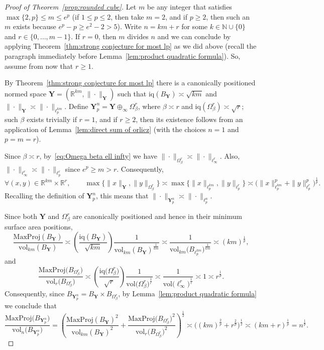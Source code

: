 \documentclass[11pt,reqno]{amsart}
\renewcommand{\le}{\leqslant}
\renewcommand{\ge}{\geqslant}
\newcommand{\Y}{\mathbf Y}
\newcommand{\R}{\mathbb R}
\theoremstyle{remark}
\newcommand{\iq}{\mathrm{iq}}
\newcommand{\N}{\mathbb N}
\newcommand{\vol}{\mathrm{vol}}
\renewcommand{\1}{\mathbf 1}
\begin{document}
\begin{proof}[Proof of Theorem~\ref{prop:rounded cube}] Let $m$ be any integer that satisfies $\max\{2,p\}\le m\le e^p$ (if $1\le p\le 2$, then take $m=2$, and if $p\ge 2$, then such an $m$ exists because $e^p-p\ge e^2-2>5$). Write $n=km+r$ for some $k\in \N\cup \{0\}$ and $r\in \{0,\ldots,m-1\}$. If $r=0$, then $m$ divides $n$  and we can conclude by applying Theorem~\ref{thm:strong conjecture for most lp}  as we did above (recall the paragraph immediately before Lemma~\ref{lem:product quadratic formula}). So, assume from now that $r\ge 1$.

By Theorem~\ref{thm:strong conjecture for most lp} there is a canonically positioned normed space $\Y=(\R^{km},\|\cdot\|_\Y)$ such that $\iq(B_\Y)\asymp \sqrt{km}$ and  $\|\cdot\|_\Y\asymp \|\cdot\|_{\ell_p^{km}}$. Define $\Y_p^n=\Y\oplus_\infty \Omega_{\beta}^r$, where $\beta\asymp r$ and $\iq(\Omega_\beta^r)\asymp \sqrt{r}$; such $\beta$ exists trivially if $r=1$, and if $r\ge 2$, then its existence follows from an application of Lemma~\ref{lem:direct sum of orlicz} (with the choices $n=1$ and $p=m=r$).

Since $\beta\asymp r$, by~\eqref{eq:Omega beta ell infty} we have $\|\cdot\|_{\Omega_\beta^r} \asymp \|\cdot\|_{\ell_\infty^r}$. Also, $\|\cdot\|_{\ell_\infty^r}\asymp \|\cdot\|_{\ell_p^r}$ since $e^p\ge m>r$. Consequently,
$$
\forall (x,y)\in \R^{km}\times \R^r,\qquad \max\big\{\|x\|_{\Y},\|y\|_{\Omega_\beta^r}\big\}\asymp \max\big\{\|x\|_{\ell_p^{km}},\|y\|_{\ell_p^r}\big\}\asymp \Big(\|x\|_{\ell_p^{km}}^p+\|y\|_{\ell_p^r}^p\Big)^{\frac{1}{p}}.
$$
Recalling the definition of $\Y_p^n$, this means that $\|\cdot\|_{\Y_p^n}\asymp \|\cdot\|_{\ell_p^n}$.


Since both $\Y$ and $\Omega_\beta^r$ are canonically positioned and hence in their minimum surface area positions,
$$
\frac{\mathrm{MaxProj}(B_\Y)}{\vol_{km}(B_\Y)}\asymp \left(\frac{\iq(B_\Y)}{\sqrt{km}}\right)\frac{1}{\vol_{km}(B_\Y)^{\frac{1}{km}}}\asymp \frac{1}{\vol_{km}\big(B_{\ell_p^{km}}\big)^{\frac{1}{km}}}\asymp (km)^{\frac{1}{p}},
$$
and
$$
\frac{\mathrm{MaxProj}\big(B_{\Omega_\beta^r}\big)}{\vol_{r}\big(B_{\Omega_\beta^r}\big)}\asymp \left(\frac{\iq\big(\Omega_\beta^r\big)}{\sqrt{r}}\right)\frac{1}{\vol\big(\Omega_\beta^r\big)^{\frac{1}{r}}}\asymp \frac{1}{\vol\big(\ell_\infty^r\big)^{\frac{1}{r}}}\asymp 1\asymp r^{\frac{1}{p}}.
$$
Consequently, since $B_{\Y_p^n}=B_\Y\times B_{\Omega_\beta^r}$, by Lemma~\ref{lem:product quadratic formula} we conclude that
\begin{equation*}
\frac{\mathrm{MaxProj}\big(B_{\Y_p^n}\big)}{\vol_{n}\big(B_{\Y_p^n}\big)}=\left(\frac{\mathrm{MaxProj}(B_\Y)^2}{\vol_{km}(B_\Y)^2}+\frac{\mathrm{MaxProj}
\big(B_{\Omega_\beta^r}\big)^2}{\vol_{r}\big(B_{\Omega_\beta^r}\big)^2}\right)^{\frac12}\asymp \Big((km)^{\frac{2}{p}}+r^{\frac{2}{p}}\Big)^{\frac12}\asymp (km+r)^{\frac{1}{p}}=n^{\frac{1}{p}}. \tag*{\qedhere}
\end{equation*}
\end{proof}
\end{document}
